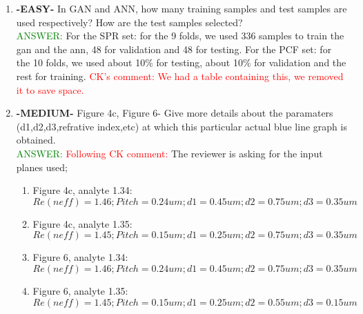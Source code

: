 \documentclass{article}
\begin{document}
\begin{enumerate}
\item \textbf{-EASY-} In GAN and ANN, how many training samples and test samples are used respectively? How are the test samples selected? \\
\textcolor{green}{ANSWER: } For the SPR set: for the 9 folds, we used 336 samples to train the gan and the ann, 48 for validation and 48 for testing. For the PCF set: for the 10 folds, we used about 10\% for testing, about 10\% for validation and the rest for training. \textcolor{red}{CK's comment: We had a table containing this, we removed it to save space.}

\item \textbf{-MEDIUM-} Figure 4c, Figure 6- Give more details about the paramaters (d1,d2,d3,refrative index,etc) at which this particular actual blue line graph is obtained.\\
\textcolor{green}{ANSWER: } \textcolor{red}{Following CK comment: } The reviewer is asking for the input planes used; \\
\begin{enumerate}
\item Figure 4c, analyte 1.34: \\
$Re(neff) = 1.46; Pitch = 0.24 um ; d1 = 0.45 um; d2= 0.75um; d3 = 0.35um $ \\
\item Figure 4c, analyte 1.35: \\
$Re(neff) = 1.45; Pitch = 0.15 um ; d1 = 0.25 um; d2= 0.75um; d3 = 0.35um $ \\
\item Figure 6, analyte 1.34: \\
$Re(neff) = 1.46; Pitch = 0.24 um ; d1 = 0.45 um; d2= 0.75um; d3 = 0.35um $ \\
\item Figure 6, analyte 1.35: \\
$Re(neff) = 1.45; Pitch = 0.15 um ; d1 = 0.25 um; d2= 0.55um; d3 = 0.15um $ \\

\end{enumerate} 


\end{enumerate}
\end{document}
